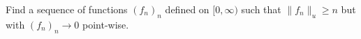 \documentclass[10pt,twoside,openany]{memoir}
\begin{document}
    \begin{exercise}
        Find a sequence of functions $(f_n)_n$ defined on $[0,\infty)$ such that $\lVert f_n\rVert _u \geq n$ but with $(f_n)_n \rightarrow 0$ point-wise.
    \end{exercise}
\end{document}
